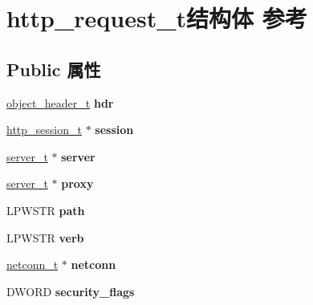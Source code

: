 \hypertarget{structhttp__request__t}{}\section{http\+\_\+request\+\_\+t结构体 参考}
\label{structhttp__request__t}
\subsection*{Public 属性}
\begin{DoxyCompactItemize}
\item 
\mbox{\label{structhttp__request__t_ac4e229be038c2fa1bb15307dd8618d86}} 
\hyperlink{struct__object__header__t}{object\+\_\+header\+\_\+t} {\bfseries hdr}
\item 
\mbox{\label{structhttp__request__t_a69d18ca6048a19844393edef03beeae7}} 
\hyperlink{structhttp__session__t}{http\+\_\+session\+\_\+t} $\ast$ {\bfseries session}
\item 
\mbox{\label{structhttp__request__t_a014e42118377bd596800987e4ffa4882}} 
\hyperlink{structserver__t}{server\+\_\+t} $\ast$ {\bfseries server}
\item 
\mbox{\label{structhttp__request__t_ae238fde9e078295bdfdcc2eedc00d780}} 
\hyperlink{structserver__t}{server\+\_\+t} $\ast$ {\bfseries proxy}
\item 
\mbox{\label{structhttp__request__t_af2137c636a234ca2b9c1228e2aad4af9}} 
L\+P\+W\+S\+TR {\bfseries path}
\item 
\mbox{\label{structhttp__request__t_af43d3bf82e68032c647939a6214e004f}} 
L\+P\+W\+S\+TR {\bfseries verb}
\item 
\mbox{\label{structhttp__request__t_acf8410eddd3f3b67009d1f2a005b4af5}} 
\hyperlink{structnetconn__t}{netconn\+\_\+t} $\ast$ {\bfseries netconn}
\item 
\mbox{\label{structhttp__request__t_a09c7425389563d5fc4126ed05cd657f7}} 
D\+W\+O\+RD {\bfseries security\+\_\+flags}
\item 

\end{DoxyCompactItemize}
